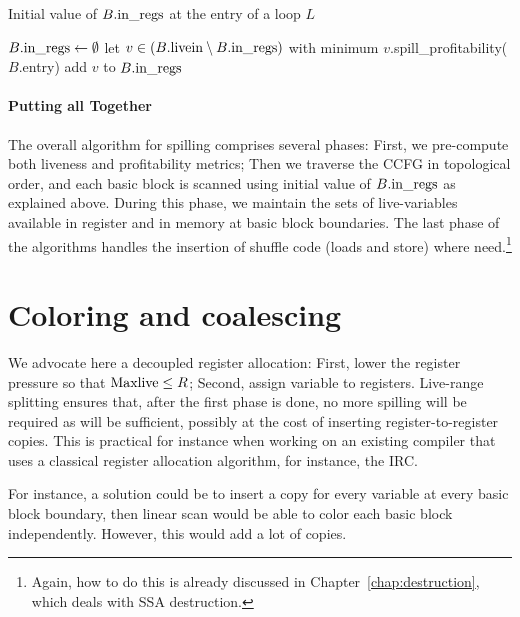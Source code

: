 {\begin{algorithm}[h]
\caption{\label{ra:code:initloop}Initial value of $B.\textrm{in\_regs}$ at the entry of a loop $L$}
  $B.\textrm{in\_regs} \gets \emptyset$\;
    {
    let $v \in (B.\textrm{livein} \setminus B.\textrm{in\_regs})$ with minimum $v$.spill\_profitability($B$.entry)\;
    add $v$ to $B.\textrm{in\_regs}$\;
  }
\end{algorithm}


\paragraph{Putting all Together}
The overall algorithm for spilling comprises several phases:
First, we pre-compute both liveness and profitability metrics;
Then we traverse the CCFG in topological order, and each basic block is scanned using initial value of $B.\textrm{in\_regs}$ as explained above.
During this phase, we maintain the sets of live-variables available in register and in memory at basic block boundaries.
The last phase of the algorithms handles the insertion of shuffle code (loads and store) where need.\footnote{Again, how to do this is already discussed in Chapter~\ref{chap:destruction}, which deals with SSA destruction.}


\section{Coloring and coalescing}

We advocate here a decoupled register allocation: First, lower the register pressure so that $\mathrm{Maxlive} \leq R$; Second, assign variable to registers.
Live-range splitting ensures that, after the first phase is done, no more spilling will be required as \regs will be sufficient, possibly at the cost of inserting register-to-register copies.
This is practical for instance when working on an existing compiler that uses a classical register allocation algorithm, for instance, the IRC.


For instance, a solution could be to insert a copy for every variable at every basic block boundary, then linear scan would be able to color each basic block independently. However, this would add a lot of copies.

}
